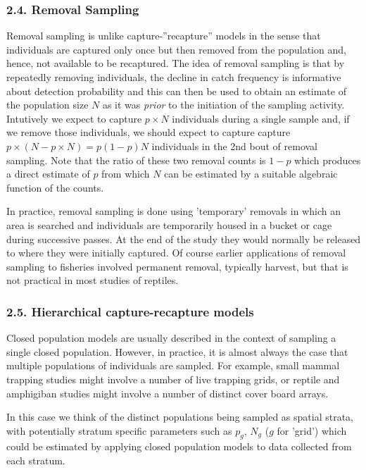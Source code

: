 \documentclass{book}
\begin{document}
\subsubsection*{2.4. Removal Sampling}

Removal sampling is unlike capture-''recapture'' models in the sense
that individuals are captured only once but then removed from the
population and, hence, not available to be recaptured. The idea of
removal sampling is that by repeatedly removing
individuals, the decline in catch frequency is informative about
detection probability and this can then be used to obtain an estimate
of the population size $N$ as it was {\it prior} to the initiation of the
sampling activity. Intutively we expect to capture $p \times N$
individuals during a single sample and, if we remove those
individuals, we should expect to capture capture $p \times (N - p
\times N) = p(1-p) N$ individuals in the 2nd bout of removal
sampling. Note that the ratio of these two removal counts is $1-p$
which produces a direct estimate of $p$ from which $N$ can be
estimated by a suitable algebraic function of the counts.

In practice, removal sampling is done using 'temporary' removals in
which an area is searched and individuals are temporarily housed in a
bucket or cage during successive passes. At the end of the study they
would normally be released to where they were initially captured. Of
course earlier applications of removal sampling to fisheries involved
permanent removal, typically harvest, but that is not practical in 
most studies of reptiles. 

\subsubsection*{2.5. Hierarchical capture-recapture models}

Closed population models are usually described in the context of
sampling a single closed population. However, in practice, it is
almost always the case that multiple populations of individuals are
sampled. For example,  small mammal trapping studies might involve a
number of live trapping grids, or reptile and amphigiban studies might
involve a number of distinct cover board arrays. 

In this case we think
of the distinct populations being sampled as spatial strata, with
potentially stratum specific parameters such as $p_{g}$, $N_{g}$ ($g$
for 'grid') which could be estimated by applying closed population
models to data collected from each stratum. 
\end{document}
